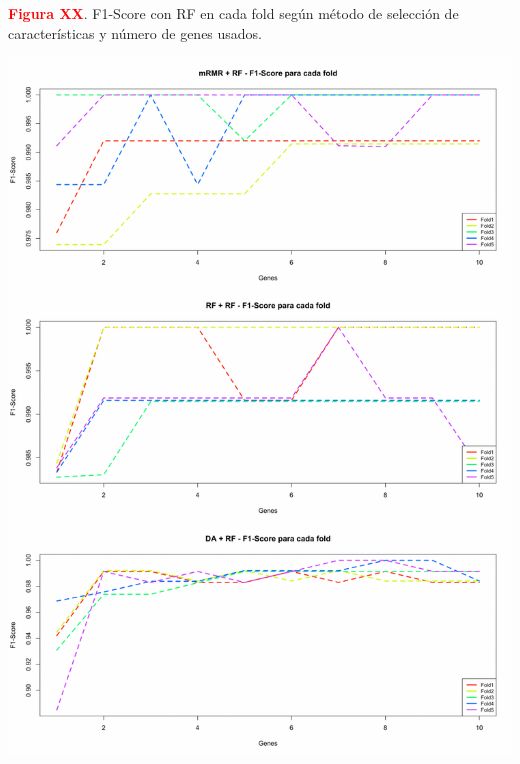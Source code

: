 \textbf{\textcolor{red}{Figura XX}}. F1-Score con RF en cada fold según método de selección de características y número de genes usados.
\begin{center}
	\includegraphics[width=.95\textwidth]{figuras/higado_biclase_folds_f1_rf.pdf} \\
\end{center}

